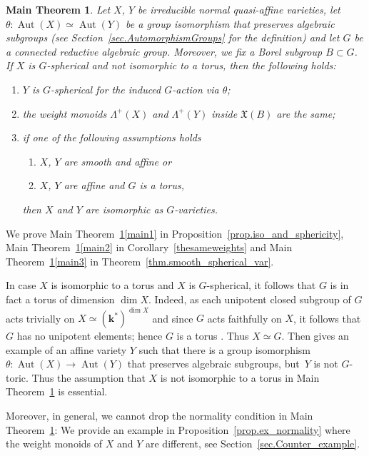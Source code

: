 \documentclass[JEP,XML,SOM,Unicode]{cedram}
\theoremstyle{plain}
\newtheorem{maintheorem}{Main Theorem}
\theoremstyle{definition}
\DeclareMathOperator{\Aut}{Aut}
\newcommand{\kk}{{\boldsymbol{k}}}
\begin{document}
\begin{maintheorem}
\label{mainthm:autos}
Let $X$, $Y$ be irreducible normal quasi-affine varieties, let
$\theta \colon \Aut(X) \simeq \Aut(Y)$ be a group isomorphism
that preserves algebraic subgroups (see Section~\ref{sec.AutomorphismGroups} for the definition)
and let $G$ be a connected reductive
algebraic group.
Moreover, we fix a Borel subgroup $B \subset G$.
If $X$ is $G$-spherical and not isomorphic to a torus, then the following holds:
\begin{enumerate}
\item \label{main1} $Y$ is $G$-spherical for the induced $G$-action via $\theta$;
\item \label{main2} the weight monoids $\Lambda^+(X)$ and $\Lambda^+(Y)$ inside $\mathfrak{X}(B)$
are the same;
\item \label{main3} if one of the following assumptions holds
\begin{enumerate}\renewcommand{\theenumii}{\roman{enumii}}
\item \label{main3smooth} $X$, $Y$ are smooth and affine or
\item \label{main3toric} $X$, $Y$ are affine and $G$ is a torus,
\end{enumerate}
then $X$ and $Y$ are isomorphic as $G$-varieties.
\end{enumerate}
\end{maintheorem}

We prove Main Theorem~\ref{mainthm:autos}\eqref{main1} in Proposition~\ref{prop.iso_and_sphericity},
Main Theorem~\ref{mainthm:autos}\eqref{main2} in Corollary~\ref{thesameweights}
and Main Theorem~\ref{mainthm:autos}\eqref{main3} in Theorem~\ref{thm.smooth_spherical_var}.

In case $X$ is isomorphic to a torus and $X$ is $G$-spherical, it follows that $G$ is in fact a torus
of dimension $\dim X$. Indeed, as each unipotent closed subgroup of $G$ acts trivially on
$X \simeq (\kk^\ast)^{\dim X}$ and since $G$ acts faithfully on $X$, it follows that $G$ has no unipotent
elements; hence $G$ is a torus \cite[Prop.\,B, \S21.4]{Hu1975Linear-algebraic-g}. Thus $X\simeq G$.
Then \cite[Exam.\,6.17]{LiReUr2018Characterization-o} gives an example
of an affine variety $Y$ such that there is a group isomorphism $\theta \colon \Aut(X) \to \Aut(Y)$
that preserves algebraic subgroups, but~$Y$ is not $G$-toric. Thus the assumption that $X$ is
not isomorphic to a torus in Main Theorem~\ref{mainthm:autos} is essential.

Moreover, in general, we cannot drop the normality condition in Main Theorem~\ref{mainthm:autos}:
We provide an example in Proposition~\ref{prop.ex_normality} where the weight monoids of $X$ and $Y$ are different,
see Section~\ref{sec.Counter_example}.
\end{document}
